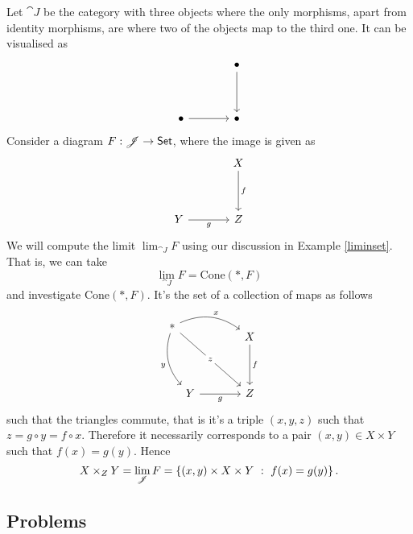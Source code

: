 \begin{example}\label{fibprodinset}
Let $\cat{J}$ be the category with three objects where the only morphisms, apart from identity morphisms, are where two of the objects map to the third one. It can be visualised as
\[\begin{tikzcd}[row sep=huge, column sep = large]
 & \bullet \arrow[d] \\
\bullet \arrow[r]                                              & \bullet               
\end{tikzcd}\]
Consider a diagram $F: \mathscr{J} \to \mathsf{Set}$, where the image is given as
\[\begin{tikzcd}[row sep=huge, column sep = large]
 & X \arrow[d, "f"] \\
Y \arrow[r, "g"']                                              & Z               
\end{tikzcd}\]
We will compute the limit $\lim_{\cat{J}}F$ using our discussion in Example \ref{liminset}. That is, we can take
\[\textstyle\lim_{\cat{J}}F = \mathrm{Cone}(*,F)\]
and investigate $\mathrm{Cone}(*,F)$. It's the set of a collection of maps as follows
\[\begin{tikzcd}[row sep=huge, column sep=large]
* \arrow[rdd, "y"', bend right] \arrow[rrd, "x", bend left] \arrow[rrdd, "z" description] &[-3.5em]                   &                  \\[-4em]
                                                                                          &[-3.5em]                   & X \arrow[d, "f"] \\
                                                                                          &[-3.5em] Y \arrow[r, "g"'] & Z               
\end{tikzcd}\]
such that the triangles commute, that is it's a triple $(x,y,z)$ such that $z = g\circ y = f\circ x$. Therefore it necessarily corresponds to a pair $(x,y) \in X \times Y$ such that $f(x) = g(y)$. Hence \[X\times_Z Y = \lim_{\mathscr{J}}F = \left\{(x,y) \times X \times Y\ :\ f(x) = g(y)\right\}.\]
\end{example}

\vspace*{0.2in}

\subsection{Problems}\vspace{0.1in}

